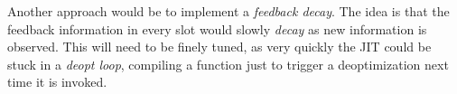 Another approach would be to implement a \textit{feedback decay}. The idea is that the feedback information in every slot would slowly \textit{decay} as new information is observed. This will need to be finely tuned, as very quickly the JIT could be stuck in a \textit{deopt loop}, compiling a function just to trigger a deoptimization next time it is invoked.
